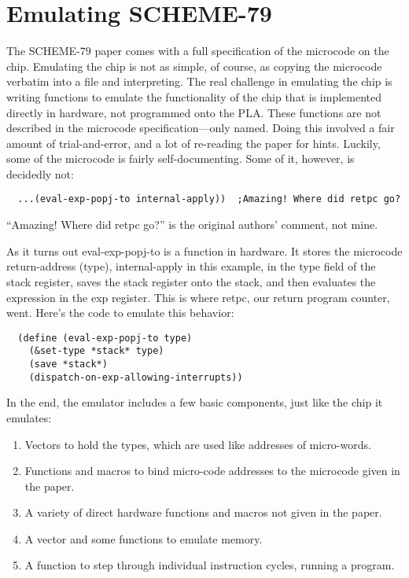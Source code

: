 \documentclass[12pt]{article}
\begin{document}
\section{Emulating SCHEME-79}
The SCHEME-79 paper comes with a full specification of the microcode
on the chip.  Emulating the chip is not as simple, of course, as
copying the microcode verbatim into a file and interpreting.  The real
challenge in emulating the chip is writing functions to emulate the
functionality of the chip that is implemented directly in hardware,
not programmed onto the PLA.  These functions are not described in the
microcode specification---only named.  Doing this involved a fair
amount of trial-and-error, and a lot of re-reading the paper for
hints.  Luckily, some of the microcode is fairly self-documenting.
Some of it, however, is decidedly not:
\begin{lstlisting}
  ...(eval-exp-popj-to internal-apply))  ;Amazing! Where did retpc go?
\end{lstlisting}
``Amazing! Where did retpc go?'' is the original authors' comment, not
mine.\cite[39]{s79}\par
As it turns out eval-exp-popj-to is a function in hardware.  It stores
the microcode return-address (type), internal-apply in this example,
in the type field of the stack register, saves the stack register onto
the stack, and then evaluates the expression in the exp register. This
is where retpc, our return program counter, went.  Here's the code to
emulate this behavior:
\begin{lstlisting}
  (define (eval-exp-popj-to type)
    (&set-type *stack* type)
    (save *stack*)
    (dispatch-on-exp-allowing-interrupts))
\end{lstlisting}\par
In the end, the emulator includes a few basic components, just like
the chip it emulates:
\begin{enumerate}
\item Vectors to hold the types, which are used like addresses of
  micro-words.
\item Functions and macros to bind micro-code addresses to the
  microcode given in the paper.
\item A variety of direct hardware functions and macros not given in
  the paper.
\item A vector and some functions to emulate memory.
\item A function to step through individual instruction cycles,
  running a program.
\end{enumerate}
\end{document}
